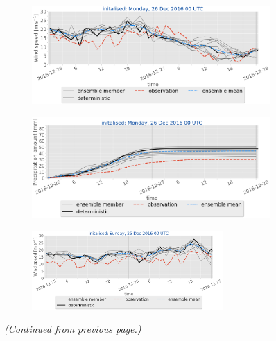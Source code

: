 \begin{figure}[H]
	\begin{subfigure}[b]{0.49\textwidth}
		\includegraphics[trim={0.cm 5.cm 0cm 0cm},clip,
		width=\textwidth]{./fig_sfc_ws/20161226_00}
		\caption{}\label{fig:res:sfc_ws26}
	\end{subfigure}
	
	\begin{subfigure}[b]{0.49\textwidth}
		\includegraphics[trim={0.cm 3.6cm 0cm 0cm},clip,
		width=\textwidth]{./fig_sfc_precip/20161226_00}
		\caption{}\label{fig:res:sfc_precip26}
	\end{subfigure}
	
	\begin{subfigure}[b]{\textwidth}
		\centering
		\includegraphics[trim={5.5cm 0cm 5.cm 17.2cm},clip,
		width=0.8\textwidth]{./fig_sfc_ws/20161225_00}
	\end{subfigure}
	\caption{\textit{(Continued from previous page.)} }
\end{figure}
